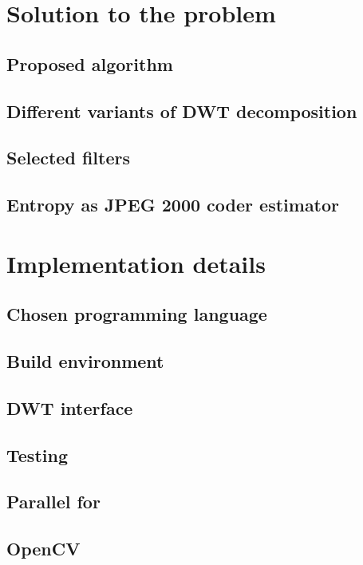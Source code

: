 \section{Solution to the problem}

\subsection{Proposed algorithm}

\subsection{Different variants of DWT decomposition}

\subsection{Selected filters}

\subsection{Entropy as JPEG 2000 coder estimator}


\section{Implementation details}

\subsection{Chosen programming language}

\subsection{Build environment}

\subsection{DWT interface}

\subsection{Testing}

\subsection{Parallel for}

\subsection{OpenCV}

